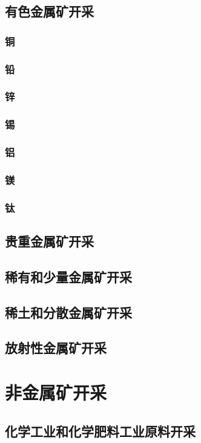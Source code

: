 \documentclass[UTF8]{../../ApplicationUniverse}
\begin{document}
    \subsection{有色金属矿开采}
        \subsubsection{铜}
        \subsubsection{铅}
        \subsubsection{锌}
        \subsubsection{锡}
        \subsubsection{铝}
        \subsubsection{镁}
        \subsubsection{钛}
    \subsection{贵重金属矿开采}
    \subsection{稀有和少量金属矿开采}
    \subsection{稀土和分散金属矿开采}
    \subsection{放射性金属矿开采}
\section{非金属矿开采}
    \subsection{化学工业和化学肥料工业原料开采}
\end{document}
